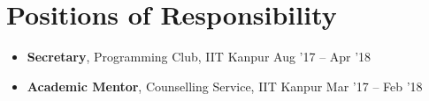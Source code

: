 \newcommand{\por}[3]{\textbf{#1}, #2 \hfill #3}

\section*{Positions of Responsibility}
\begin{itemize}

\setlength\itemsep{0pt}
\item \por{Secretary}{Programming Club, IIT Kanpur}{Aug '17 -- Apr '18}%
\item \por{Academic Mentor}{Counselling Service, IIT Kanpur}{Mar '17 -- Feb '18}%

\end{itemize}
